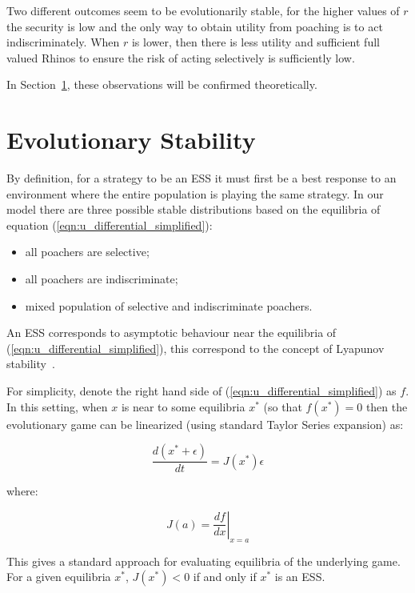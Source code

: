 \documentclass[10pt]{article}
\begin{document}
Two different outcomes seem to be evolutionarily stable, for the higher values
of \(r\) the security is low and the only way to obtain utility from poaching is
to act indiscriminately. When \(r\) is lower, then there is less utility and
sufficient full valued Rhinos to ensure the risk of acting selectively is
sufficiently low.

In Section~\ref{section:evolutionary_stability}, these observations will be
confirmed theoretically.

\section{Evolutionary Stability}\label{section:evolutionary_stability}

By definition, for a strategy to be an ESS it must first be a best response to an
environment where the entire population is playing the same strategy.
In our model there are three possible stable distributions based on the
equilibria of equation (\ref{eqn:u_differential_simplified}):

\begin{itemize}
    \item all poachers are selective;
    \item all poachers are indiscriminate;
    \item mixed population of selective and indiscriminate poachers.
\end{itemize}

An ESS corresponds to asymptotic behaviour near the equilibria of
(\ref{eqn:u_differential_simplified}), this correspond to the concept of
Lyapunov stability~\cite{lyapunov1992general}.

For simplicity, denote the right hand side of
(\ref{eqn:u_differential_simplified}) as \(f\).
In this setting, when \(x\) is near to some equilibria \(x^*\) (so that
\(f(x^*)=0\) then the evolutionary game can be linearized (using standard Taylor
Series expansion) as:

\begin{equation}
    \frac{d(x^* + \epsilon)}{dt} = J(x^*)\epsilon
\end{equation}

where:

\begin{equation}
    J(a) = \left.\frac{df}{dx}\right|_{x=a}
\end{equation}

This gives a standard approach for evaluating equilibria of the underlying game.
For a given equilibria \(x^*\), \(J(x^*)<0\) if and only if \(x^*\) is an ESS\@.
\end{document}
